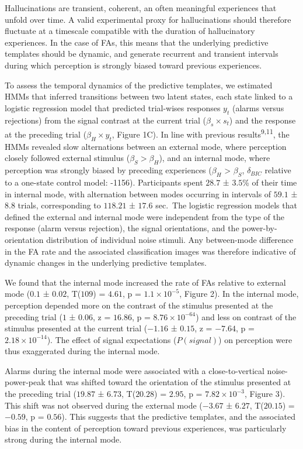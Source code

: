 \documentclass[
]{article}
\begin{document}
Hallucinations are transient, coherent, an often meaningful experiences
that unfold over time. A valid experimental proxy for hallucinations
should therefore fluctuate at a timescale compatible with the duration
of hallucinatory experiences. In the case of FAs, this means that the
underlying predictive templates should be dynamic, and generate
recurrent and transient intervals during which perception is strongly
biased toward previous experiences.

To assess the temporal dynamics of the predictive templates, we
estimated HMMs that inferred transitions between two latent states, each
state linked to a logistic regression model that predicted trial-wises
responses \(y_t\) (alarms versus rejections) from the signal contrast at
the current trial (\(\beta_s \times s_t\)) and the response at the
preceding trial (\(\beta_H \times y_t\), Figure 1C). In line with
previous results\textsuperscript{9,11}, the HMMs revealed slow
alternations between an external mode, where perception closely followed
external stimulus (\(\beta_S > \beta_H\)), and an internal mode, where
perception was strongly biased by preceding experiences (\(\beta_H\)
\textgreater{} \(\beta_S\), \(\delta_{BIC}\) relative to a one-state
control model: -1156). Participants spent \(28.7\) ± \(3.5\)\% of their
time in internal mode, with alternation between modes occurring in
intervals of \(59.1\) ± \(8.8\) trials, corresponding to \(118.21\) ±
\(17.6\) sec.~The logistic regression models that defined the external
and internal mode were independent from the type of the response (alarm
versus rejection), the signal orientations, and the power-by-orientation
distribution of individual noise stimuli. Any between-mode difference in
the FA rate and the associated classification images was therefore
indicative of dynamic changes in the underlying predictive templates.

We found that the internal mode increased the rate of FAs relative to
external mode (\(0.1\) ± \(0.02\), T(\(109\)) = \(4.61\), p =
\(\ensuremath{1.1\times 10^{-5}}\), Figure 2). In the internal mode,
perception depended more on the contrast of the stimulus presented at
the preceding trial (\(1\) ± \(0.06\), z = \(16.86\), p =
\(\ensuremath{8.76\times 10^{-64}}\)) and less on contrast of the
stimulus presented at the current trial (\(-1.16\) ± \(0.15\), z =
\(-7.64\), p = \(\ensuremath{2.18\times 10^{-14}}\)). The effect of
signal expectations (\(P(signal)\)) on perception were thus exaggerated
during the internal mode.

Alarms during the internal mode were associated with a close-to-vertical
noise-power-peak that was shifted toward the orientation of the stimulus
presented at the preceding trial (\(19.87\) ± \(6.73\), T(\(20.28\)) =
\(2.95\), p = \(\ensuremath{7.82\times 10^{-3}}\), Figure 3). This shift
was not observed during the external mode (\(-3.67\) ± \(6.27\),
T(\(20.15\)) = \(-0.59\), p = \(0.56\)). This suggests that the
predictive templates, and the associated bias in the content of
perception toward previous experiences, was particularly strong during
the internal mode.
\end{document}

